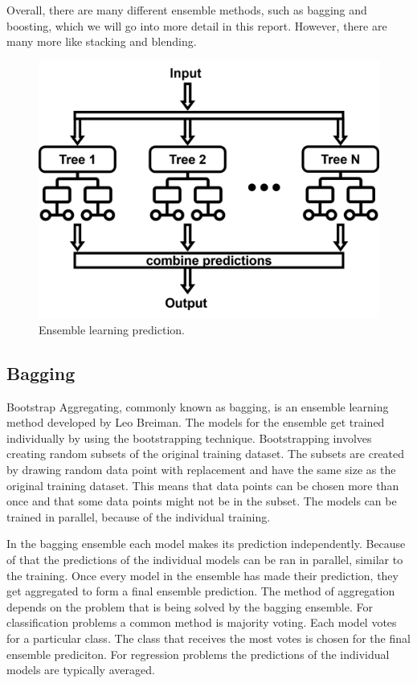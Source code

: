Overall, there are many different ensemble methods, such as bagging and boosting, 
which we will go into more detail in this report. However, there are many more 
like stacking and blending.

\begin{figure}[htbp]
    \centering
    \includegraphics[width=.5\textwidth]{figures/ensemble_method_prediction}
    \caption{Ensemble learning prediction.}
\end{figure}


\subsection{Bagging}

Bootstrap Aggregating, commonly known as bagging, is an ensemble learning method
developed by Leo Breiman. The models for the ensemble get trained individually
by using the bootstrapping technique. Bootstrapping involves creating random
subsets of the original training dataset. The subsets are created by drawing 
random data point with replacement and have the same size as the original
training dataset. This means that data points can be chosen more than once and
that some data points might not be in the subset. The models can be trained in
parallel, because of the individual training.


In the bagging ensemble each model makes its prediction independently. Because of
that the predictions of the individual models can be ran in parallel, similar to
the training. Once every model in the ensemble has made their prediction, they get
aggregated to form a final ensemble prediction. The method of aggregation depends
on the problem that is being solved by the bagging ensemble. 
For classification problems a common method is majority voting. Each model votes 
for a particular class. The class that receives the most votes is chosen for the
final ensemble prediciton.
For regression problems the predictions of the individual models are typically 
averaged.

